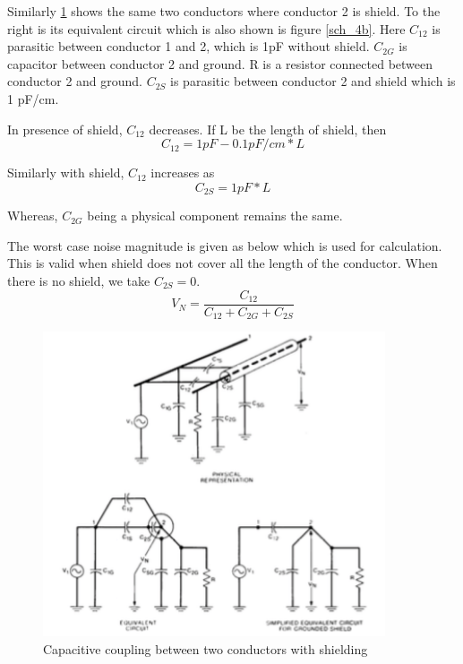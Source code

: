 \documentclass[12pt,a4paper,UKenglish]{article}
\begin{document}
Similarly  \ref{two_con_sh} shows the same two conductors where conductor 2 is shield. To the right is its equivalent circuit which is also shown is figure  \ref{sch_4b}. Here $C_{12}$ is parasitic between conductor 1 and 2, which is 1pF without shield. $C_{2G}$ is capacitor between conductor 2 and ground. R is a resistor connected between conductor 2 and ground. $C_{2S}$ is parasitic between conductor 2 and shield which is 1 pF/cm. 

In presence of shield, $C_{12}$ decreases. If L be the length of shield, then
\begin{equation*}
C_{12} =  1 pF - 0.1pF/cm * L
\end{equation*}

Similarly with shield, $C_{12}$ increases as 
\begin{equation*}
C_{2S} =  1 pF * L
\end{equation*}

Whereas, $C_{2G}$ being a physical component remains the same.

The worst case noise magnitude is given as below which is used for calculation. This is valid when shield does not cover all the length of the conductor. When there is no shield, we take
$C_{2S} = 0$.
\begin{equation*}
V_N = \frac{C_{12}}{C_{12}+C_{2G}+C_{2S}}   
\end{equation*}


\begin{figure} [H]
  \centering 
  \includegraphics[width=0.9\textwidth]{img/two_con_sh.png} 
  \caption{Capacitive coupling between two conductors with shielding}
  \label{two_con_sh} 
\end{figure}
\end{document}
